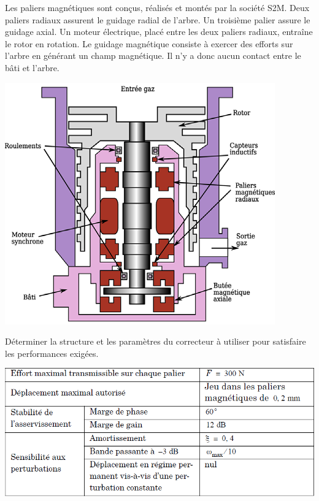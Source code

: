 \documentclass[10pt,fleqn]{article} %
\begin{document}

\vspace{5cm}
\pagestyle{fancy}
\thispagestyle{plain}

\def\columnseprulecolor{\color{ocre}}
\setlength{\columnseprule}{0.4pt} 

\def\pathfig{images}

\begin{multicols}{2}

Les paliers magnétiques sont conçus, réalisés et montés par la société S2M.
Deux paliers radiaux assurent le guidage radial de l'arbre. Un troisième
palier assure le guidage axial. Un moteur électrique, placé entre les deux
paliers radiaux, entraîne le rotor en rotation. Le guidage magnétique consiste à exercer des efforts sur l'arbre en générant un
champ magnétique. Il n'y a donc aucun contact entre le bâti et l'arbre.

\begin{center}
\includegraphics[width=.8\linewidth]{images/fig_05}
\end{center}


\begin{obj}
Déterminer la structure et les paramètres du correcteur à utiliser pour satisfaire les performances exigées.
\end{obj}


\begin{center}
\includegraphics[width=\linewidth]{images/fig_04}
\end{center}



\end{multicols}
\end{document}
